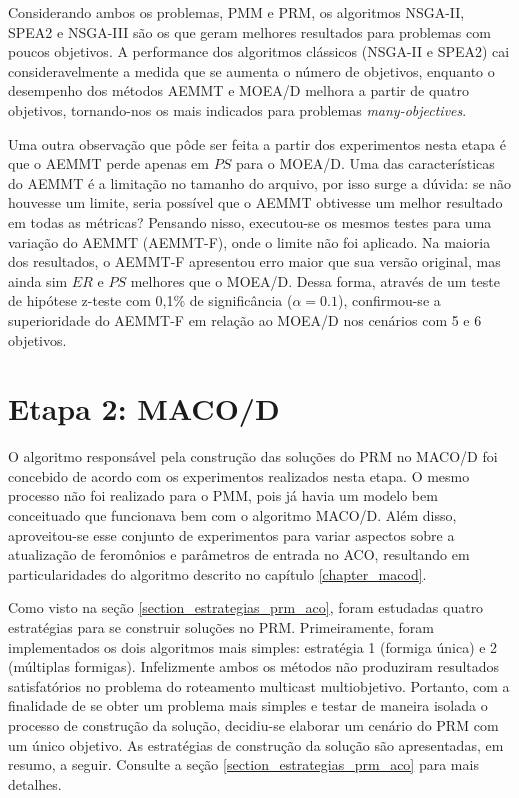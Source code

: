 Considerando ambos os problemas, PMM e PRM, os algoritmos NSGA-II, SPEA2 e NSGA-III são os que geram melhores resultados para problemas com poucos objetivos. A performance dos algoritmos clássicos (NSGA-II e SPEA2) cai consideravelmente a medida que se aumenta o número de objetivos, enquanto o desempenho dos métodos AEMMT e MOEA/D melhora a partir de quatro objetivos, tornando-nos os mais indicados para problemas \textit{many-objectives}.

Uma outra observação que pôde ser feita a partir dos experimentos nesta etapa é que o AEMMT perde apenas em $PS$ para o MOEA/D. Uma das características do AEMMT é a limitação no tamanho do arquivo, por isso surge a dúvida: se não houvesse um limite, seria possível que o AEMMT obtivesse um melhor resultado em todas as métricas? Pensando nisso, executou-se os mesmos testes para uma variação do AEMMT (AEMMT-F), onde o limite não foi aplicado. Na maioria dos resultados, o AEMMT-F apresentou erro maior que sua versão original, mas ainda sim $ER$ e $PS$ melhores que o MOEA/D. Dessa forma, através de um teste de hipótese z-teste com 0,1\% de significância ($\alpha = 0.1$), confirmou-se a superioridade do AEMMT-F em relação ao MOEA/D nos cenários com 5 e 6 objetivos.

\section{Etapa 2: MACO/D}
\label{section_experimentos_macod}

O algoritmo responsável pela construção das soluções do PRM no MACO/D foi concebido de acordo com os experimentos realizados nesta etapa. O mesmo processo não foi realizado para o PMM, pois já havia um modelo bem conceituado que funcionava bem com o algoritmo MACO/D. Além disso, aproveitou-se esse conjunto de experimentos para variar aspectos sobre a atualização de feromônios e parâmetros de entrada no ACO, resultando em particularidades do algoritmo descrito no capítulo \ref{chapter_macod}.

Como visto na seção \ref{section_estrategias_prm_aco}, foram estudadas quatro estratégias para se construir soluções no PRM. Primeiramente, foram implementados os dois algoritmos mais simples: estratégia 1 (formiga única) e 2 (múltiplas formigas). Infelizmente ambos os métodos não produziram resultados satisfatórios no problema do roteamento multicast multiobjetivo. Portanto, com a finalidade de se obter um problema mais simples e testar de maneira isolada o processo de construção da solução, decidiu-se elaborar um cenário do PRM com um único objetivo. As estratégias de construção da solução são apresentadas, em resumo, a seguir. Consulte a seção \ref{section_estrategias_prm_aco} para mais detalhes.

